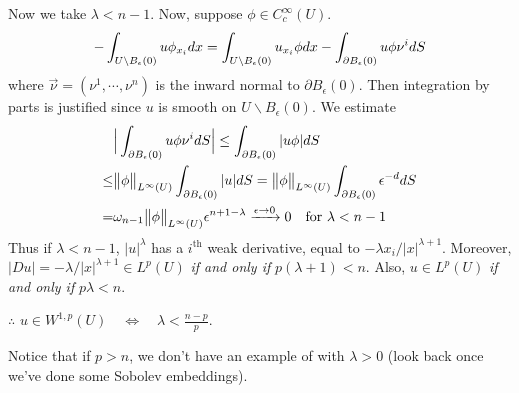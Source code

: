 \documentclass[12pt,a4paper]{report}
\begin{document}
\quad Now we take $\lambda < n-1$. Now, suppose $\phi \in C^{\infty}_c(U)$.
\begin{align*}
-\int_{U \backslash B_{\epsilon}(0)} u\phi_{x_i} dx = \int_{U \backslash B_{\epsilon}(0)} u_{x_i} \phi dx - \int_{\partial B_{\epsilon}(0)} u \phi \nu^i dS
\end{align*}
where $\vec{\nu} = (\nu^1, \cdots, \nu^n)$ is the inward normal to $\partial B_{\epsilon}(0)$. Then integration by parts is justified since $u$ is smooth on $U \backslash B_{\epsilon}(0)$. We estimate
\begin{align*}
& \Big| \int_{\partial B_{\epsilon}(0)} u\phi \nu^i dS \Big| \leq \int_{\partial B_{\epsilon}(0)} |u\phi| dS \\
\leq & \bigl\lVert\phi\bigr\rVert_{L^{\infty}(U)} \int_{\partial B_{\epsilon}(0)} |u| dS = \bigl\lVert\phi\bigr\rVert_{L^{\infty}(U)} \int_{\partial B_{\epsilon}(0)} \epsilon^{-d} dS \\
= & \omega_{n-1} \bigl\lVert\phi\bigr\rVert_{L^{\infty}(U)} \epsilon^{n+1-\lambda} \xrightarrow{\epsilon \rightarrow 0} 0 \quad \text{for } \lambda < n-1
\end{align*}
Thus if $\lambda < n-1$, $|u|^{\lambda}$ has a $i^{\text{th}}$ weak derivative, equal to $-\lambda x_i /|x|^{\lambda+1}$. Moreover, $|Du| = -\lambda / |x|^{\lambda +1} \in L^p(U)$ \emph{if and only if} $p(\lambda +1) <n$. Also, $u\in L^p(U)$ \emph{if and only if} $p\lambda <n$.

\quad $\therefore$ $u\in W^{1,p}(U) \quad \Leftrightarrow \quad \lambda < \frac{n-p}{p}$.
\s

Notice that if $p>n$, we don't have an example of with $\lambda >0$ (look back once we've done some Sobolev embeddings).
\s
\end{document}
